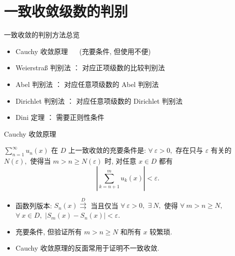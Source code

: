 
\section{一致收敛级数的判别}


\begin{frame}{一致收敛的判别方法总览}

{\larger[1]
\begin{itemize}[<+->]
\item Cauchy 收敛原理 ~~ (充要条件, 但使用不便)
\vspace{0.5em}
\item Weierstraß 判别法 ： 对应正项级数的比较判别法
\vspace{0.5em}
\item Abel 判别法 ： 对应任意项级数的 Abel 判别法
\vspace{0.5em}
\item Dirichlet 判别法 ： 对应任意项级数的 Dirichlet 判别法
\vspace{0.5em}
\item Dini 定理 ： 需要正则性条件
\end{itemize}
}

\end{frame}


\begin{frame}{Cauchy 收敛原理}

\begin{thm}
$\sum_{n=1}^\infty u_n(x)$ 在 $D$ 上一致收敛的充要条件是: $\forall~\varepsilon > 0,$ 存在只与 $\varepsilon$ 有关的 $N(\varepsilon),$ 使得当 $m > n \geqslant N(\varepsilon)$ 时, 对任意 $x \in D$ 都有
\[\left\lvert \sum_{k=n+1}^m u_k(x) \right\rvert < \varepsilon.\]
\end{thm}

\pause

\begin{remark}
\begin{itemize}[<+->]
\item 函数列版本: $S_n(x) \stackrel{D}{\rightrightarrows}$ 当且仅当 $\forall~\varepsilon > 0,$ $\exists~N,$ 使得 $\forall~m > n \geqslant N,$ $\forall~x \in D,$ $|S_m(x) - S_n(x)| < \varepsilon.$
\item 充要条件, 但验证所有 $m > n \geqslant N$ 和所有 $x$ 较繁琐.
\item Cauchy 收敛原理的反面常用于证明{\color{red}不一致收敛}.
\end{itemize}
\end{remark}

\end{frame}

